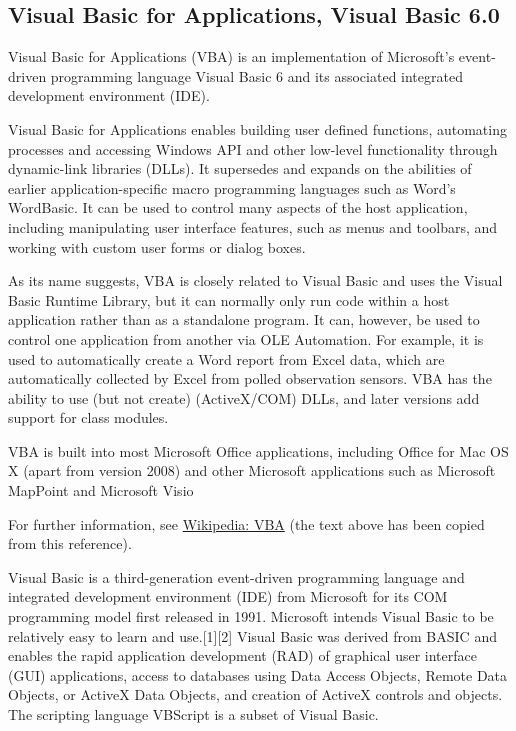 \newpage
\subsection{Visual Basic for Applications, Visual Basic 6.0}

Visual Basic for Applications (VBA) is an implementation of Microsoft's event-driven programming language Visual Basic 6 and its associated integrated development environment (IDE).

\vpara
Visual Basic for Applications enables building user defined functions, automating processes and accessing Windows API and other low-level functionality through dynamic-link libraries (DLLs). It supersedes and expands on the abilities of earlier application-specific macro programming languages such as Word's WordBasic. It can be used to control many aspects of the host application, including manipulating user interface features, such as menus and toolbars, and working with custom user forms or dialog boxes.

\vpara
As its name suggests, VBA is closely related to Visual Basic and uses the Visual Basic Runtime Library, but it can normally only run code within a host application rather than as a standalone program. It can, however, be used to control one application from another via OLE Automation. For example, it is used to automatically create a Word report from Excel data, which are automatically collected by Excel from polled observation sensors. VBA has the ability to use (but not create) (ActiveX/COM) DLLs, and later versions add support for class modules.

\vpara
VBA is built into most Microsoft Office applications, including Office for Mac OS X (apart from version 2008) and other Microsoft applications such as Microsoft MapPoint and Microsoft Visio

For further information, see \href{http://en.wikipedia.org/wiki/Visual_Basic_for_Applications}{Wikipedia: VBA} (the text above has been copied from this reference).

\vpara
Visual Basic is a third-generation event-driven programming language and integrated development environment (IDE) from Microsoft for its COM programming model first released in 1991. Microsoft intends Visual Basic to be relatively easy to learn and use.[1][2] Visual Basic was derived from BASIC and enables the rapid application development (RAD) of graphical user interface (GUI) applications, access to databases using Data Access Objects, Remote Data Objects, or ActiveX Data Objects, and creation of ActiveX controls and objects. The scripting language VBScript is a subset of Visual Basic.

